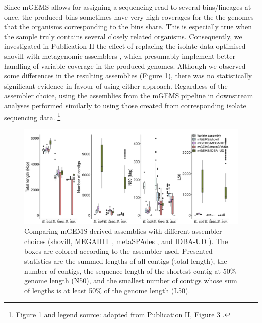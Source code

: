 \documentclass[officiallayout]{tktla}
\let\svthefootnote\thefootnote
\begin{document}
Since mGEMS allows for assigning a sequencing read to several
bins/lineages at once, the produced bins sometimes have very high
coverages for the the genomes that the organisms corresponding to the
bins share. This is especially true when the sample truly contains
several closely related organisms. Consequently, we investigated in
Publication II the effect of replacing the isolate-data optimised
shovill with metagenomic assemblers \citep{peng2012idba,
  li2015megahit, nurk2017metaspades}, which presumably implement
better handling of variable coverage in the produced genomes. Although
we observed some differences in the resulting assemblies
(Figure \ref{fig:mgems-assembler-choice-statistics}), there was no
statistically significant evidence in favour of using either
approach. Regardless of the assembler choice, using the assemblies
from the mGEMS pipeline in downstream analyses performed similarly to
using those created from corresponding isolate sequencing data.
\noindent\let\thefootnote\relax\footnote{Figure \ref{fig:mgems-assembler-choice-statistics} and legend source: adapted from Publication II, Figure 3 \citep{maklin_bacterial_2021}.}
\addtocounter{footnote}{-1}\let\thefootnote\svthefootnote
\begin{figure}[!t]
    \centering
    \includegraphics[width=\textwidth,keepaspectratio]{img/reproduced/MGen2021_mGEMS_Figure_3d.pdf}
    \caption{Comparing mGEMS-derived assemblies with different
      assembler choices (shovill, MEGAHIT \citep{li2015megahit},
      metaSPAdes \citep{nurk2017metaspades}, and IDBA-UD
      \citep{peng2012idba}). The boxes are colored according to the
      assembler used. Presented statistics are the summed lengths
      of all contigs (total length), the number of contigs, the
      sequence length of the shortest contig at 50\% genome length
      (N50), and the smallest number of contigs whose sum of lengths
      is at least 50\% of the genome length (L50).}
    \label{fig:mgems-assembler-choice-statistics}
\end{figure}
\end{document}
